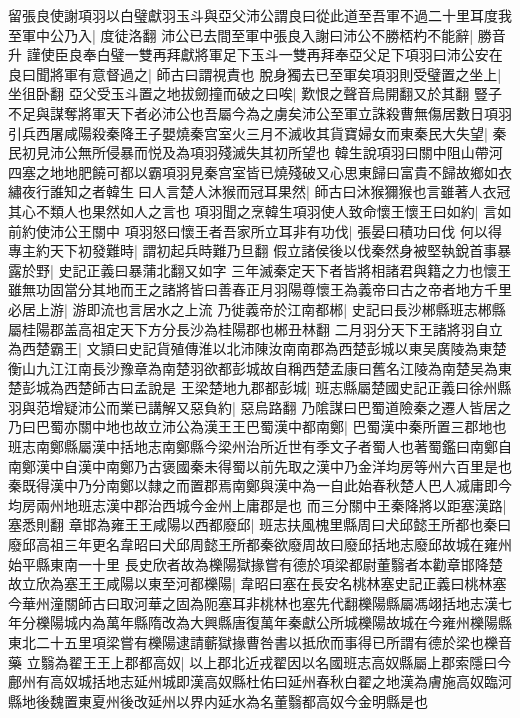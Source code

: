 留張良使謝項羽以白璧獻羽玉斗與亞父沛公謂良曰從此道至吾軍不過二十里耳度我至軍中公乃入|{
	度徒洛翻}
沛公已去間至軍中張良入謝曰沛公不勝桮杓不能辭|{
	勝音升}
謹使臣良奉白璧一雙再拜獻將軍足下玉斗一雙再拜奉亞父足下項羽曰沛公安在良曰聞將軍有意督過之|{
	師古曰謂視責也}
脫身獨去已至軍矣項羽則受璧置之坐上|{
	坐徂卧翻}
亞父受玉斗置之地拔劒撞而破之曰唉|{
	歎恨之聲音烏開翻又於其翻}
豎子不足與謀奪將軍天下者必沛公也吾屬今為之虜矣沛公至軍立誅殺曹無傷居數日項羽引兵西屠咸陽殺秦降王子嬰燒秦宫室火三月不滅收其貨寶婦女而東秦民大失望|{
	秦民初見沛公無所侵暴而悦及為項羽殘滅失其初所望也}
韓生說項羽曰關中阻山帶河四塞之地地肥饒可都以霸項羽見秦宫室皆已燒殘破又心思東歸曰富貴不歸故鄉如衣繡夜行誰知之者韓生曰人言楚人沐猴而冠耳果然|{
	師古曰沐猴獮猴也言雖著人衣冠其心不類人也果然如人之言也}
項羽聞之烹韓生項羽使人致命懷王懷王曰如約|{
	言如前約使沛公王關中}
項羽怒曰懷王者吾家所立耳非有功伐|{
	張晏曰積功曰伐}
何以得專主約天下初發難時|{
	謂初起兵時難乃旦翻}
假立諸侯後以伐秦然身被堅執銳首事暴露於野|{
	史記正義曰暴蒲北翻又如字}
三年滅秦定天下者皆將相諸君與籍之力也懷王雖無功固當分其地而王之諸將皆曰善春正月羽陽尊懷王為義帝曰古之帝者地方千里必居上游|{
	游即流也言居水之上流}
乃徙義帝於江南都郴|{
	史記曰長沙郴縣班志郴縣屬桂陽郡盖高祖定天下方分長沙為桂陽郡也郴丑林翻}
二月羽分天下王諸將羽自立為西楚霸王|{
	文頴曰史記貨殖傳淮以北沛陳汝南南郡為西楚彭城以東吴廣陵為東楚衡山九江江南長沙豫章為南楚羽欲都彭城故自稱西楚孟康曰舊名江陵為南楚吴為東楚彭城為西楚師古曰孟說是}
王梁楚地九郡都彭城|{
	班志縣屬楚國史記正義曰徐州縣}
羽與范增疑沛公而業已講解又惡負約|{
	惡烏路翻}
乃隂謀曰巴蜀道險秦之遷人皆居之乃曰巴蜀亦關中地也故立沛公為漢王王巴蜀漢中都南鄭|{
	巴蜀漢中秦所置三郡地也班志南鄭縣屬漢中括地志南鄭縣今梁州治所近世有季文子者蜀人也著蜀鑑曰南鄭自南鄭漢中自漢中南鄭乃古褒國秦未得蜀以前先取之漢中乃金洋均房等州六百里是也秦既得漢中乃分南鄭以隸之而置郡焉南鄭與漢中為一自此始春秋楚人巴人㓕庸即今均房兩州地班志漢中郡治西城今金州上庸郡是也}
而三分關中王秦降將以距塞漢路|{
	塞悉則翻}
章邯為雍王王咸陽以西都廢邱|{
	班志扶風槐里縣周曰犬邱懿王所都也秦曰廢邱高祖三年更名韋昭曰犬邱周懿王所都秦欲廢周故曰廢邱括地志廢邱故城在雍州始平縣東南一十里}
長史欣者故為櫟陽獄掾嘗有德於項梁都尉董翳者本勸章邯降楚故立欣為塞王王咸陽以東至河都櫟陽|{
	韋昭曰塞在長安名桃林塞史記正義曰桃林塞今華州潼關師古曰取河華之固為阨塞耳非桃林也塞先代翻櫟陽縣屬馮翊括地志漢七年分櫟陽城内為萬年縣隋改為大興縣唐復萬年秦獻公所城櫟陽故城在今雍州櫟陽縣東北二十五里項梁嘗有櫟陽逮請蘄獄掾曹咎書以抵欣而事得已所謂有德於梁也櫟音藥}
立翳為翟王王上郡都高奴|{
	以上郡北近戎翟因以名國班志高奴縣屬上郡索隱曰今鄜州有高奴城括地志延州城即漢高奴縣杜佑曰延州春秋白翟之地漢為膚施高奴臨河縣地後魏置東夏州後改延州以界内延水為名董翳都高奴今金明縣是也}
